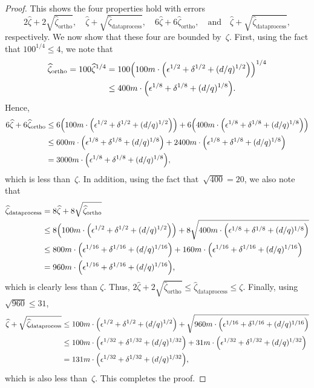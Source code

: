 \begin{proof}
This shows the four properties hold with errors
\begin{equation*}
2\widehat{\zeta} + 2\sqrt{\widehat{\zeta}_{\mathrm{ortho}}},\quad
\widehat{\zeta} + \sqrt{\widehat{\zeta}_{\mathrm{dataprocess}}},\quad
6 \widehat{\zeta} + 6\widehat{\zeta}_{\mathrm{ortho}},\quad
\text{and} \quad \widehat{\zeta} + \sqrt{\widehat{\zeta}_{\mathrm{dataprocess}}},
\end{equation*}
respectively. We now show that these four are bounded by~$\zeta$.
First, using the fact that $100^{1/4} \leq 4$, we note that
\begin{align*}
\widehat{\zeta}_{\mathrm{ortho}}
= 100 \widehat{\zeta}^{1/4}
&= 100 \Big(100m \cdot \Big(\epsilon^{1/2} + \delta^{1/2} + (d/q)^{1/2}\Big)\Big)^{1/4}\\
&\leq 400 m \cdot \Big(\epsilon^{1/8} + \delta^{1/8} + (d/q)^{1/8}\Big).
\end{align*}
Hence,
\begin{align*}
6 \widehat{\zeta} + 6\widehat{\zeta}_{\mathrm{ortho}}
& \leq 6 \Big(100m \cdot \Big(\epsilon^{1/2} + \delta^{1/2} + (d/q)^{1/2}\Big)\Big)
	+ 6 \Big(400 m \cdot \Big(\epsilon^{1/8} + \delta^{1/8} + (d/q)^{1/8}\Big)\Big)\\
&\leq 600m \cdot \Big(\epsilon^{1/8} + \delta^{1/8} + (d/q)^{1/8}\Big)
	+2400 m \cdot \Big(\epsilon^{1/8} + \delta^{1/8} + (d/q)^{1/8}\Big)\\
&= 3000m\cdot \Big(\epsilon^{1/8} + \delta^{1/8} + (d/q)^{1/8}\Big),
\end{align*}
which is less than~$\zeta$.
In addition, using the fact that~$\sqrt{400} = 20$, we also note that
\begin{align*}
\widehat{\zeta}_{\mathrm{dataprocess}}
&= 8 \widehat{\zeta} + 8 \sqrt{\widehat{\zeta}_{\mathrm{ortho}}}\\
&\leq 8 \Big(100m \cdot \Big(\epsilon^{1/2} + \delta^{1/2} + (d/q)^{1/2}\Big)\Big)
	+ 8 \sqrt{400 m \cdot \Big(\epsilon^{1/8} + \delta^{1/8} + (d/q)^{1/8}\Big)}\\
&\leq 800m \cdot \Big(\epsilon^{1/16} + \delta^{1/16} + (d/q)^{1/16}\Big)
	+ 160m \cdot \Big(\epsilon^{1/16} + \delta^{1/16} + (d/q)^{1/16}\Big)\\
&= 960m \cdot \Big(\epsilon^{1/16} + \delta^{1/16} + (d/q)^{1/16}\Big),
\end{align*}
which is clearly less than $\zeta$.
Thus, $2\widehat{\zeta} + 2\sqrt{\widehat{\zeta}_{\mathrm{ortho}}} \leq \widehat{\zeta}_{\mathrm{dataprocess}} \leq \zeta$.
Finally, using $\sqrt{960} \leq 31$,
\begin{align*}
\widehat{\zeta} + \sqrt{\widehat{\zeta}_{\mathrm{dataprocess}}}
&\leq  100m \cdot \Big(\epsilon^{1/2} + \delta^{1/2} + (d/q)^{1/2}\Big)
		+ \sqrt{960m \cdot \Big(\epsilon^{1/16} + \delta^{1/16} + (d/q)^{1/16}\Big)}\\
&\leq  100m \cdot \Big(\epsilon^{1/32} + \delta^{1/32} + (d/q)^{1/32}\Big)
		+ 31 m \cdot \Big(\epsilon^{1/32} + \delta^{1/32} + (d/q)^{1/32}\Big)\\
&=  131m \cdot \Big(\epsilon^{1/32} + \delta^{1/32} + (d/q)^{1/32}\Big),
\end{align*}
which is also less than~$\zeta$.
This completes the proof.
\end{proof}

